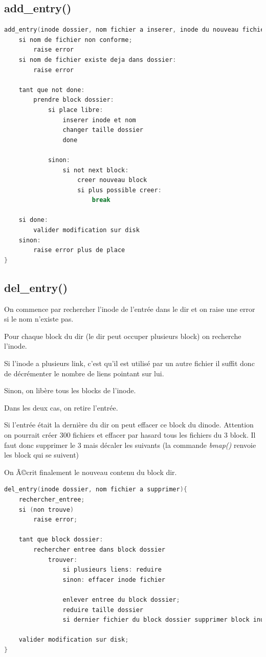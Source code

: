 \documentclass[a4paper,12pt]{article}
\begin{document}
\subsection{add\_entry()}

\begin{lstlisting}[language=C, caption=pseudo code add\_entry()]
add_entry(inode dossier, nom fichier a inserer, inode du nouveau fichier){
	si nom de fichier non conforme;
		raise error
	si nom de fichier existe deja dans dossier:
		raise error
		
	tant que not done:
		prendre block dossier:
			si place libre:
				inserer inode et nom
				changer taille dossier
				done

			sinon:
				si not next block:
					creer nouveau block
					si plus possible creer:
						break
						
	si done:
		valider modification sur disk
	sinon:
		raise error plus de place
}
\end{lstlisting}

\subsection{del\_entry()}

On commence par rechercher l'inode de l'entrée dans le dir et on raise une error si le nom n'existe pas.

Pour chaque block du dir (le dir peut occuper plusieurs block) on recherche l'inode.

Si l'inode a plusieurs link, c'est qu'il est utilisé par un autre fichier il suffit donc de décrémenter le nombre de liens pointant sur lui.

Sinon, on libère tous les blocks de l'inode.

Dans les deux cas, on retire l'entrée.

Si l'entrée était la dernière du dir on peut effacer ce block du dinode. Attention on pourrait créer 300 fichiers et effacer par hasard tous les fichiers du 3 block. Il faut donc supprimer le 3 mais décaler les suivants (la commande \emph{bmap()} renvoie les block qui se suivent)

On Ã©crit finalement le nouveau contenu du block dir.

\begin{lstlisting}[language=C, caption=pseudo code del\_entry()]
del_entry(inode dossier, nom fichier a supprimer){
	rechercher_entree;
	si (non trouve)
		raise error;

	tant que block dossier:
		rechercher entree dans block dossier
			trouver:
				si plusieurs liens: reduire
				sinon: effacer inode fichier
			
				enlever entree du block dossier;
				reduire taille dossier
				si dernier fichier du block dossier supprimer block inutile;
	
	valider modification sur disk;
}
\end{lstlisting}
\end{document}
